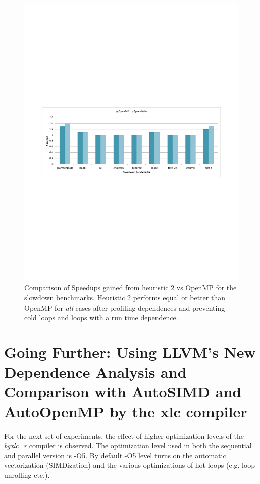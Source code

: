 \documentclass[10pt]{report}          %
\begin{document}
\begin{figure}
\centering
\includegraphics[scale=0.75]{./pdf/heu2.pdf}
\caption{Comparison of Speedups gained from heuristic 2 vs OpenMP for the slowdown benchmarks. Heuristic 2 performs equal or better than OpenMP for \textit{all} cases after profiling dependences and preventing cold loops and loops with a run time dependence. }
\label{fig:heu2}
\end{figure}

\section{Going Further: Using LLVM's New Dependence Analysis and Comparison with AutoSIMD and AutoOpenMP by the xlc compiler}

For the next set of experiments, the effect of higher optimization levels of the \textit{bgxlc\_r} compiler is observed.  The optimization level used in both the sequential and parallel version is -O5.  By default -O5 level turns on the automatic vectorization (SIMDization) and the various optimizations of hot loops (e.g. loop unrolling etc.).  \\
\end{document}
